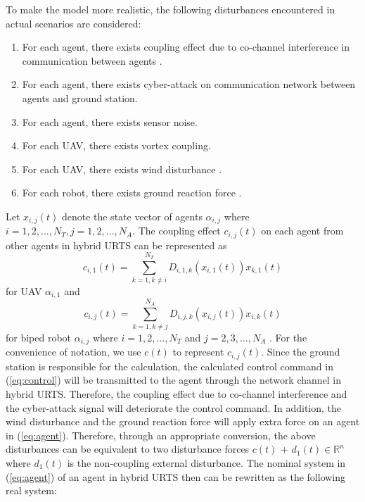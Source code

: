 \documentclass{ieeeaccess}
\begin{document}
To make the model more realistic, the following disturbances encountered in actual scenarios are considered:
\begin{enumerate}
    \item For each agent, there exists coupling effect due to co-channel interference in communication between agents \cite{9834947}.
    \item For each agent, there exists cyber-attack on communication network between agents and ground station.
    \item For each agent, there exists sensor noise.
    \item For each UAV, there exists vortex coupling.
    \item For each UAV, there exists wind disturbance \cite{9075385}.
    \item For each robot, there exists ground reaction force \cite{chen2013human}. 
\end{enumerate}
Let $x_{i,j}(t)$ denote the state vector of agents $\alpha_{i,j}$ where $i=1,2,\dots,N_T, j=1,2,\dots,N_A$. The coupling effect $c_{i,j}(t)$ on each agent from other agents in hybrid URTS can be represented as \begin{equation} \label{eq:UAV couple}
    c_{i,1}(t) = \sum_{k = 1, k \neq i}^{N_T}D_{i, 1, k}(x_{i, 1}(t))x_{k, 1}(t)
\end{equation} for UAV $\alpha_{i, 1}$ and \begin{equation} \label{eq:robot couple}
    c_{i,j}(t) = \sum_{k = 1, k \neq j}^{N_A}D_{i, j, k}(x_{i, j}(t))x_{i, k}(t)
\end{equation} for biped robot $\alpha_{i, j}$ where $i=1,2,\dots,N_T$ and $j=2,3,\dots,N_A$ \cite{9834947}. For the convenience of notation, we use $c(t)$ to represent $c_{i,j}(t)$. Since the ground station is responsible for the calculation, the calculated control command in (\ref{eq:control}) will be transmitted to the agent through the network channel in hybrid URTS. Therefore, the coupling effect due to co-channel interference and the cyber-attack signal will deteriorate the control command. In addition, the wind disturbance and the ground reaction force will apply extra force on an agent in (\ref{eq:agent}). Therefore, through an appropriate conversion, the above disturbances can be equivalent to two disturbance forces $c(t)$ + $d_1(t)\in\mathbb{R}^n$ where $d_1(t)$ is the non-coupling external disturbance. The nominal system in (\ref{eq:agent}) of an agent in hybrid URTS then can be rewritten as the following real system:
\end{document}
